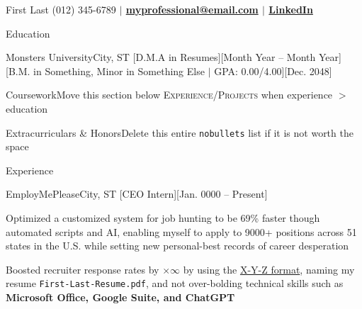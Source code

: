 \documentclass[10pt]{extarticle} %
\begin{document}
\lrHeader
{First Last}
{(012) 345-6789 \textbf{
        $\vert$ \href{mailto:myprofessional@email.com}{myprofessional@email.com}
        $\vert$ \href{https://www.youtube.com/watch?v=dQw4w9WgXcQ}{LinkedIn}}}

\begin{sectionList}{Education}
    \item \lr
    {Monsters University}{City, ST}
    [D.M.A in Resumes][Month Year -- Month Year]
    [B.M. in Something, Minor in Something Else $\vert$ GPA: 0.00/4.00][Dec. 2048]
    \begin{nobullets}
        \item {}
        {Coursework}{Move this section below \textsc{Experience/Projects} when experience $>$ education}
        \item {}
        {Extracurriculars \& Honors}{Delete this entire \texttt{nobullets} list if it is not worth the space}
    \end{nobullets}
\end{sectionList}

\begin{sectionList}{Experience}
    \item \lr
    {EmployMePlease}{City, ST}
    [CEO Intern][Jan. 0000 -- Present]
    \begin{bullets}
        \item Optimized a customized system for job hunting to be 69\% faster though automated scripts and AI, enabling myself to apply to 9000+ positions across 51 states in the U.S. while setting new personal-best records of career desperation
        \item Boosted recruiter response rates by $\times \infty$ by using the \href{https://www.inc.com/bill-murphy-jr/google-recruiters-say-these-5-resume-tips-including-x-y-z-formula-will-improve-your-odds-of-getting-hired-at-google.html}{X-Y-Z format}, naming my resume \texttt{First-Last-Resume.pdf}, and not over-bolding technical skills such as \textbf{Microsoft Office, Google Suite, and ChatGPT}
    \end{bullets}
\end{sectionList}
\end{document}
